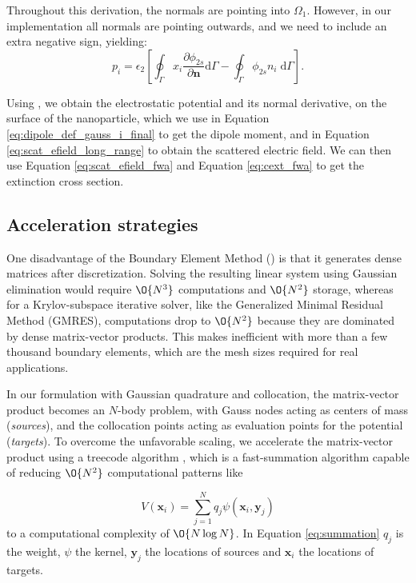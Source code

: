 %
Throughout this derivation, the normals are pointing into $\Omega_1$. However, in our implementation 
all normals are pointing outwards, and we need to include an extra negative sign, yielding:
%
\begin{equation} \label{eq:dipole_def_gauss_i_final}
{p_i} = \epsilon_2 \left[ \oint_\Gamma  x_i  \frac{\partial \phi_{2s}}{\partial \mathbf{n}} \text{d}\Gamma - \oint_\Gamma \phi_{2s} n_i \; \text{d}\Gamma \right].
\end{equation}

Using \bem, we obtain the electrostatic potential and its normal derivative, on the surface of the nanoparticle, 
which we use in Equation \eqref{eq:dipole_def_gauss_i_final} to get the dipole 
moment, and in Equation \eqref{eq:scat_efield_long_range} to obtain the scattered
electric field. We can then use Equation \eqref{eq:scat_efield_fwa} and Equation 
\eqref{eq:cext_fwa} to get the extinction cross section.


\subsection{Acceleration strategies} \label{sec:acc_strategies}

One disadvantage of the Boundary Element Method (\bem) is that it generates dense matrices
after discretization. Solving the resulting linear system using
Gaussian elimination would require $\O{N^3}$ computations and $\O{N^2}$ storage, whereas for a
Krylov-subspace iterative solver, like the Generalized Minimal Residual Method (GMRES),
computations drop to $\O{N^2}$ because they are dominated by dense matrix-vector 
products. This makes \bem inefficient with more than a few thousand boundary elements,
which are the mesh sizes required for real applications. 

In our formulation with Gaussian quadrature and collocation, the matrix-vector product
becomes an $N$-body problem, with Gauss nodes acting as centers of mass (\emph{sources}), 
and the collocation points acting as evaluation points for the potential (\emph{targets}).
To overcome the unfavorable scaling,
we accelerate the matrix-vector product using a treecode algorithm \cite{BarnesHut1986,DuanKrasny2001}, 
which is a fast-summation algorithm capable of reducing $\O{N^2}$
computational patterns like

\begin{equation} \label{eq:summation}
V(\mathbf{x}_i) = \sum_{j=1}^{N} q_j \psi(\mathbf{x}_i, \mathbf{y}_j) 
\end{equation}
%
to a computational complexity of $\O{N \log N}$. In Equation \eqref{eq:summation} 
$q_j$ is the weight, $\psi$ the kernel, $\mathbf{y}_j$ the locations of sources and 
$\mathbf{x}_i$ the locations of targets.

